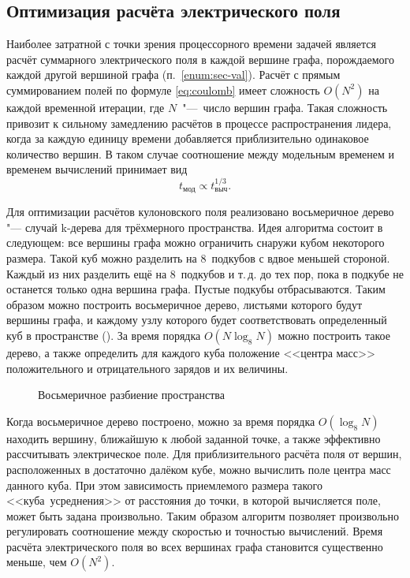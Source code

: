 \subsection{Оптимизация расчёта электрического поля}
Наиболее затратной с точки зрения процессорного времени задачей является расчёт суммарного электрического поля в каждой вершине графа, порождаемого каждой другой вершиной графа (п.~\ref{enum:sec-val}). Расчёт с прямым суммированием полей по формуле \eqref{eq:coulomb} имеет сложность $O(N^2)$ на каждой временной итерации, где $N$~"---~число вершин графа. Такая сложность привозит к сильному замедлению расчётов в процессе распространения лидера, когда за каждую единицу времени добавляется приблизительно одинаковое количество вершин. В таком случае соотношение между модельным временем и временем вычислений принимает вид
\begin{equation}
	t_\text{мод} \propto t_\text{выч}^{1/3}.
\end{equation}

Для оптимизации расчётов кулоновского поля реализовано восьмеричное дерево "--- случай k-дерева \cite{Bentley1975} для трёхмерного пространства. Идея алгоритма состоит в следующем: все вершины графа можно ограничить снаружи кубом некоторого размера. Такой куб можно разделить на 8~подкубов с вдвое меньшей стороной. Каждый из них разделить ещё на 8~подкубов и т.\,д. до тех пор, пока в подкубе не останется только одна вершина графа. Пустые подкубы отбрасываются. Таким образом можно построить восьмеричное дерево, листьями которого будут вершины графа, и каждому узлу которого будет соответствовать определенный куб в пространстве (). За время порядка $O(N\log_8 N)$ можно построить такое дерево, а также определить для каждого куба положение <<центра масс>> положительного и отрицательного зарядов и их величины.
\begin{figure}[h]
	\caption{Восьмеричное разбиение пространства}
	\label{fig:octree}
\end{figure}

Когда восьмеричное дерево построено, можно за время порядка $O(\log_8 N)$ находить вершину, ближайшую к любой заданной точке, а также эффективно рассчитывать электрическое поле. Для приблизительного расчёта поля от вершин, расположенных в достаточно далёком кубе, можно вычислить поле центра масс данного куба. При этом зависимость приемлемого размера такого <<куба~усреднения>> от расстояния до точки, в которой вычисляется поле, может быть задана произвольно. Таким образом алгоритм позволяет произвольно регулировать соотношение между скоростью и точностью вычислений. Время расчёта электрического поля во всех вершинах графа становится существенно меньше, чем $O(N^2)$.

